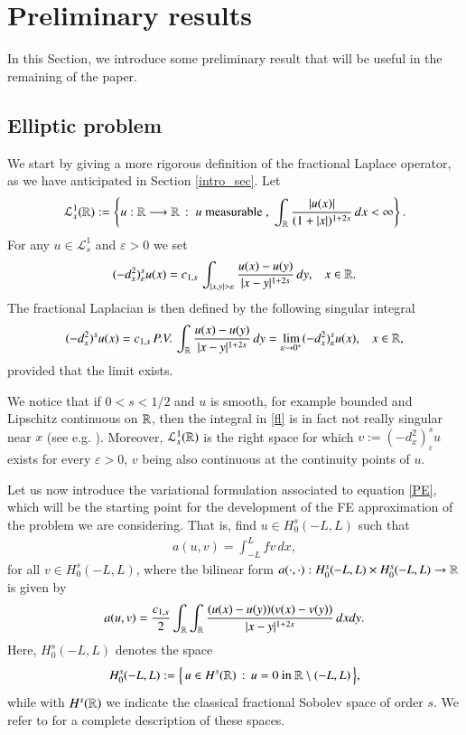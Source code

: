 \section{Preliminary results}\label{theor_sec}

In this Section, we introduce some preliminary result that will be useful in the remaining of the paper.

\subsection{Elliptic problem}

We start by giving a more rigorous definition of the fractional Laplace operator, as we have anticipated in Section \ref{intro_sec}. Let
\begin{align*}
	\mathcal L^1_s(\mathbb{R}) :=\left\{ u:\mathbb{R}\longrightarrow\mathbb{R}\,:\; u\textrm{ measurable },\;\int_{\mathbb{R}}\frac{|u(x)|}{(1+|x|)^{1+2s}}\,dx<\infty\right\}.
\end{align*}
For any $u\in\mathcal L_s^1$ and $\varepsilon>0$ we set 
\begin{align*}
	(-d_x^2)^s_{\varepsilon} u(x) = \ccs\,\int_{|x,y|>\varepsilon}\frac{u(x)-u(y)}{|x-y|^{1+2s}}\,dy,\;\;\; x\in\RR.
\end{align*}
The fractional Laplacian is then defined by the following singular integral
\begin{align}\label{fl}
	(-d_x^2)^{s}u(x) = c_{1,s}\,P.V.\,\int_{\mathbb{R}}\frac{u(x)-u(y)}{|x-y|^{1+2s}}\,dy = \lim_{\varepsilon\to 0^+} (-d_x^2)^s_{\varepsilon} u(x), \;\;\; x\in\mathbb{R},
\end{align}
provided that the limit exists. 

We notice that if $0<s<1/2$ and $u$ is smooth, for example bounded and Lipschitz continuous on $\mathbb{R}$, then the integral in \eqref{fl} is in fact not really singular near $x$ (see e.g. \cite[Remark 3.1]{dihitchhiker}). Moreover, $\mathcal L_s^1(\mathbb{R})$ is the right space for which $v:= (-d_x^2)^s_{\varepsilon} u$ exists for every $\varepsilon > 0$, $v$ being also continuous at the continuity points of $u$.

Let us now introduce the variational formulation associated to equation \eqref{PE}, which will be the starting point for the development of the FE approximation of the problem we are considering. That is, find $u\in H^s_0(-L,L)$ such that
\begin{align*}
	a(u,v) = \int_{-L}^L fv\,dx,	
\end{align*}
for all $v\in H_0^s(-L,L)$, where the bilinear form $a(\cdot,\cdot):H^s_0(-L,L)\times H^s_0(-L,L)\to \mathbb{R}$ is given by
\begin{align*}
	a(u,v)=\frac{c_{1,s}}{2} \int_{\mathbb{R}}\int_{\mathbb{R}}\frac{(u(x)-u(y))(v(x)-v(y))}{|x-y|^{1+2s}}\,dxdy.	
\end{align*}
Here, $H^s_0(-L,L)$ denotes the space 
\begin{align*}
	H^s_0(-L,L) :=\Big\{\, u\in H^s(\mathbb{R})\,:\,u=0 \textrm{ in } \mathbb{R}\setminus(-L,L)\,\Big\}, 
\end{align*}
while with $H^s(\mathbb{R})$ we indicate the classical fractional Sobolev space of order $s$. We refer to \cite{dihitchhiker} for a complete description of these spaces.  

